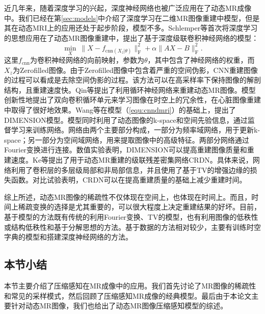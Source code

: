 近几年来，随着深度学习的兴起，深度神经网络也被广泛应用在了动态MR成像中。我们已经在第\ref{sec:models}中介绍了深度学习在二维MR图像重建中模型，但是其在动态MRI上的应用还处于起步阶段，模型不多。Schlemper等\cite{schlemper2017deep}首次将深度学习的思想应用在了动态MR图像重建中，提出了基于深度级联卷积神经网络的模型：
\begin{equation}
	\min_X \ \|X-f_{\mathrm{cnn}(X_z|\theta)}\|_\mathrm{F}^2+\alpha\|AX-B\|^2_\mathrm{F}.
	\label{equ:cnndmri}
\end{equation}
这里$f_{\mathrm{cnn}}$为卷积神经网络的向前映射，参数为$\theta$，其中包含了神经网络的权重，而$X_z$为Zerofilled图像。由于Zerofilled图像中包含着严重的空间伪影，CNN重建图像的过程可以看成是去除空间伪影的过程。该方法可以在高采样率下保持图像的解剖结构，且重建速度快。Qin等\cite{qin2018convolutional}提出了利用循环神经网络来重建动态MR图像。模型创新性地提出了双向卷积循环单元来学习图像在时空上的冗余性，在心脏图像重建中取得了很好地效果。Wang\cite{wang2018dimension}等在模型（\ref{equ:cnndmri}）的基础上，提出了DIMENSION模型。模型同时利用了动态图像的k-space和空间先验信息，通过监督学习来训练网络。网络由两个主要部分构成，一部分为频率域网络，用于更新k-space；另一部分为空间域网络，用来提取图像中的高级特征。两部分网络通过Fourier变换进行连接。数值实验表明，DIMENSION可以提高重建图像质量和重建速度。Ke等\cite{ke2019crdn}提出了用于动态MR重建的级联残差密集网络CRDN。具体来说，网络利用了卷积层的多层级局部和非局部信息，并且使用了基于TV的增强边缘的损失函数。对比试验表明，CRDN可以在提高重建质量的基础上减少重建时间。

综上所述，动态MR图像的稀疏性不仅体现在空间上，也体现在时间上。而且，时间上稀疏变换的选择是尤其重要的，可以很大程度上决定重建结果的好坏。目前，基于模型的方法既有传统的利用Fourier变换、TV的模型，也有利用图像的低秩性或结构低秩性和基于分解思想的方法。基于数据的方法相对较少，主要有训练时空字典的模型和搭建深度神经网络的方法。

\subsection{本节小结}
本节主要介绍了压缩感知在MR成像中的应用。我们首先讨论了MR图像的稀疏性和常见的采样模式，然后回顾了压缩感知MR成像的经典模型。最后由于本论文主要针对动态MR图像，我们也给出了动态MR图像压缩感知模型的综述。

